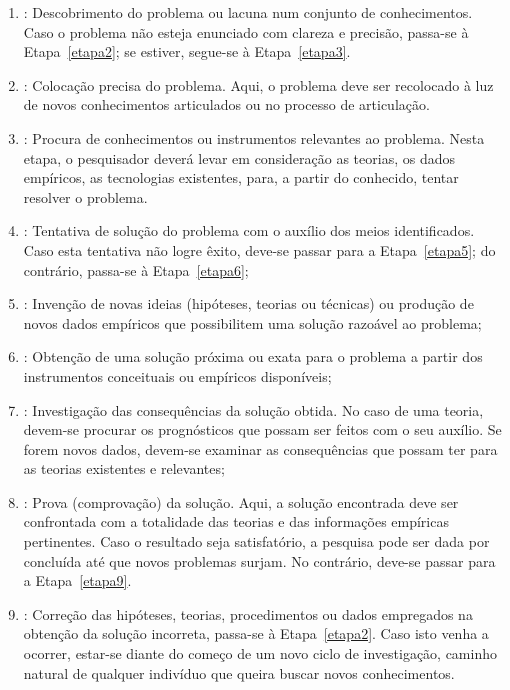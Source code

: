 \begin{enumerate}
\item \label{etapa1}: Descobrimento do problema ou lacuna num conjunto de conhecimentos.  Caso o problema não esteja enunciado com clareza e precisão, passa-se à Etapa~\ref{etapa2}; se estiver, segue-se à Etapa~\ref{etapa3}.
\item \label{etapa2}: Colocação precisa do problema. Aqui, o problema deve ser recolocado à luz de novos conhecimentos articulados ou no processo de articulação.
\item \label{etapa3}: Procura de conhecimentos ou instrumentos relevantes ao problema.  Nesta etapa, o pesquisador deverá levar em consideração as teorias, os dados empíricos, as tecnologias existentes, para, a partir do conhecido, tentar resolver o problema. 
\item \label{etapa4}: Tentativa de solução do problema com o auxílio dos meios identificados.  Caso esta tentativa não logre êxito, deve-se passar para a Etapa~\ref{etapa5}; do contrário, passa-se à Etapa~\ref{etapa6};
\item \label{etapa5}: Invenção de novas ideias (hipóteses, teorias ou técnicas) ou produção de novos dados empíricos que possibilitem uma solução razoável ao problema;
\item \label{etapa6}: Obtenção de uma solução próxima ou exata para o problema a partir dos instrumentos conceituais ou empíricos disponíveis;
\item \label{etapa7}: Investigação das consequências da solução obtida. No caso de uma teoria, devem-se procurar os prognósticos que possam ser feitos com o seu auxílio. Se forem novos dados, devem-se examinar as consequências que possam ter para as teorias existentes e relevantes;
\item \label{etapa8}: Prova (comprovação) da solução. Aqui, a solução encontrada deve ser confrontada com a totalidade das teorias e das informações empíricas pertinentes. Caso o resultado seja satisfatório, a pesquisa pode ser dada por concluída até que novos problemas surjam. No contrário, deve-se passar para a Etapa~\ref{etapa9}.
\item \label{etapa9}: Correção das hipóteses, teorias, procedimentos ou dados empregados na obtenção da solução incorreta, passa-se à Etapa~\ref{etapa2}. Caso isto venha a ocorrer, estar-se diante do começo de um novo ciclo de investigação, caminho natural de qualquer indivíduo que queira buscar novos conhecimentos.
\end{enumerate}

